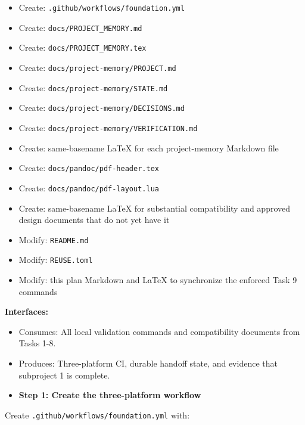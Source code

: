 \documentclass[
  letterpaper,
]{article}
\newcommand{\passthrough}[1]{#1}
\providecommand{\tightlist}{%
  \setlength{\itemsep}{0pt}\setlength{\parskip}{0pt}}
\begin{document}
\begin{itemize}
\tightlist
\item
  Create: \nolinkurl{.github/workflows/foundation.yml}
\item
  Create: \nolinkurl{docs/PROJECT_MEMORY.md}
\item
  Create: \nolinkurl{docs/PROJECT_MEMORY.tex}
\item
  Create: \nolinkurl{docs/project-memory/PROJECT.md}
\item
  Create: \nolinkurl{docs/project-memory/STATE.md}
\item
  Create: \nolinkurl{docs/project-memory/DECISIONS.md}
\item
  Create: \nolinkurl{docs/project-memory/VERIFICATION.md}
\item
  Create: same-basename LaTeX for each project-memory Markdown file
\item
  Create: \nolinkurl{docs/pandoc/pdf-header.tex}
\item
  Create: \nolinkurl{docs/pandoc/pdf-layout.lua}
\item
  Create: same-basename LaTeX for substantial compatibility and approved design documents that do not yet have it
\item
  Modify: \passthrough{\lstinline!README.md!}
\item
  Modify: \nolinkurl{REUSE.toml}
\item
  Modify: this plan Markdown and LaTeX to synchronize the enforced Task 9 commands
\end{itemize}

\textbf{Interfaces:}

\begin{itemize}
\tightlist
\item
  Consumes: All local validation commands and compatibility documents from Tasks 1-8.
\item
  Produces: Three-platform CI, durable handoff state, and evidence that subproject 1 is complete.
\end{itemize}

\begin{itemize}
\tightlist
\item[$\boxtimes$]
  \textbf{Step 1: Create the three-platform workflow}
\end{itemize}

Create \nolinkurl{.github/workflows/foundation.yml} with:
\end{document}
